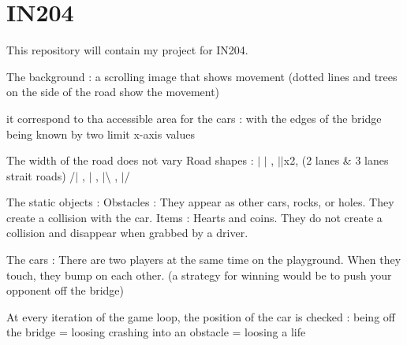 \chapter{IN204}
\hypertarget{index}{}\label{index}
\label{index_md__c_1_2_edouard_2_e_n_s_t_a_2_i_n204_01-_01_orient_xC3_xA9_01_objet_2_i_n204_01-_01_projet_2_i_n204-_01_git_2_r_e_a_d_m_e}%
%
This repository will contain my project for IN204.

The background \+: a scrolling image that shows movement (dotted lines and trees on the side of the road show the movement)

it correspond to tha accessible area for the cars \+: with the edges of the bridge being known by two limit x-\/axis values

The width of the road does not vary Road shapes \+: \texorpdfstring{$\vert$}{|} \texorpdfstring{$\vert$}{|} , \texorpdfstring{$\vert$}{|}\texorpdfstring{$\vert$}{|}x2, (2 lanes \& 3 lanes strait roads) /\texorpdfstring{$\vert$}{|} , $|$ , \texorpdfstring{$\vert$}{|}\textbackslash{} , \texorpdfstring{$\vert$}{|}/

The static objects \+: Obstacles \+: They appear as other cars, rocks, or holes. They create a collision with the car. Items \+: Hearts and coins. They do not create a collision and disappear when grabbed by a driver.

The cars \+: There are two players at the same time on the playground. When they touch, they bump on each other. (a strategy for winning would be to push your opponent off the bridge)

At every iteration of the game loop, the position of the car is checked \+: being off the bridge = loosing crashing into an obstacle = loosing a life 